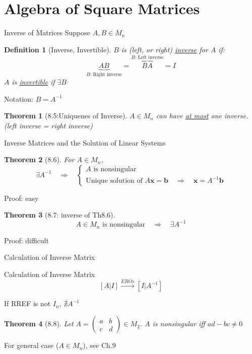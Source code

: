 \documentclass[a4paper,11pt]{article}
\newtheorem{defn}{Definition}
\newtheorem{thm}{Theorem}
\begin{document}
\section{Algebra of Square Matrices} %
\label{sec:algebra_of_square_matrices}
\begin{frame}[t]{Inverse of Matrices}
	Suppose $A,B\in M_n$
	\begin{defn}
		[Inverse, Invertible]
		$B$ is (left, or right) \uline{inverse} for $A$ if:\[
			\underbrace{AB}_{\text{$B$: Right inverse}}=\overbrace{BA}^{\text{$B$: Left inverse}}=I
		\]
		$A$ is \uline{invertible} if $\exists B$
	\end{defn}
	Notation: $B=A^{-1}$
	\begin{thm}
		[8.5:Uniquenes of Inverse]
		$A\in M_n$ can have \uline{at most} one inverse. (left inverse = right inverse)
	\end{thm}
\end{frame}

\begin{frame}[t]{Inverse Matrices and the Solution of Linear Systems}
	\begin{thm}
		[8.6] For $A\in M_n$,
		\[
			\exists A^{-1} \quad\Rightarrow\quad \begin{cases}
				A \text{ is nonsingular}\\
				\text{Unique solution of } A\mathbf{x}=\mathbf{b} \quad\Rightarrow\quad \mathbf{x}=A^{-1}\mathbf{b}
			\end{cases}
		\]
	\end{thm}
	Proof: easy
	\begin{thm}
		[8.7: inverse of Th8.6] \[
			A\in M_n \text{ is nonsingular} \quad\Rightarrow\quad \exists A^{-1}
		\]
	\end{thm}
	Proof: difficult
\end{frame}

\begin{frame}[t]{Calculation of Inverse Matrix}
	\begin{block}
		{Calculation of Inverse Matrix}
		\[
			[A\vert I] \xrightarrow{EROs} [I\vert A^{-1}]
		\]
	\end{block}
	If RREF is not $I_n$, $\nexists A^{-1}$
	\begin{thm}
		[8.8] Let $A=\begin{pmatrix}
			a&b\\c&d
		\end{pmatrix} \in M_2$. $A$ is nonsingular iff $ad-bc\neq 0$
	\end{thm}
	For general case ($A\in M_n$), see Ch.9
\end{frame}
\end{document}
